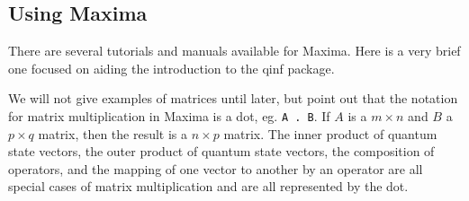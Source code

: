 \documentclass[leqno]{article}
\begin{document}
\subsection{Using Maxima}
There are several tutorials and manuals available for Maxima. Here is a very brief one
focused on aiding the introduction to the qinf package.

We will not give examples of matrices until later,
but point out that the notation for matrix multiplication in
Maxima is a dot, eg. \verb|A . B|. If $A$ is a $m\times n$
and $B$ a $p\times q$ matrix, then the result is a $n\times
p$ matrix. The inner product of quantum state vectors, the
outer product of quantum state vectors, the composition of
operators, and the mapping of one vector to another by an
operator are all special cases of matrix multiplication and
are all represented by the dot.
\end{document}
